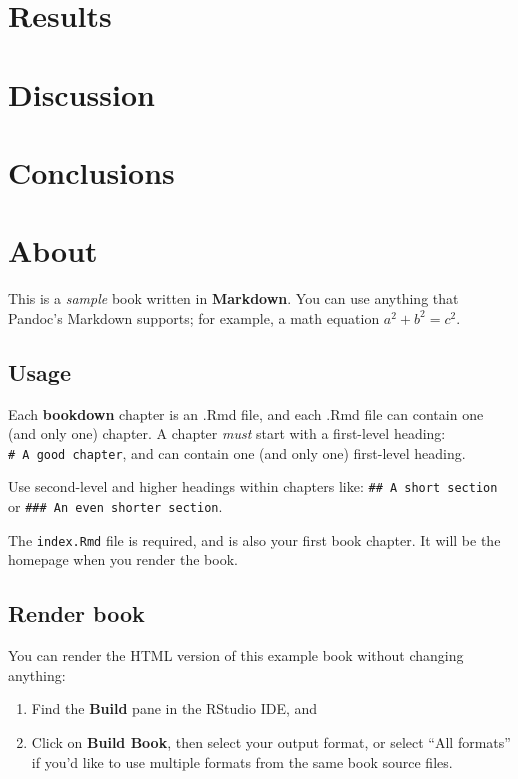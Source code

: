 \documentclass[12pt, oneside, openright]{byuthesis}
\begin{document}
\hypertarget{results}{%
\chapter{Results}\label{results}}

\hypertarget{discussion}{%
\chapter{Discussion}\label{discussion}}

\hypertarget{conclusions}{%
\chapter{Conclusions}\label{conclusions}}

\hypertarget{about}{%
\chapter{About}\label{about}}

This is a \emph{sample} book written in \textbf{Markdown}. You can use anything that Pandoc's Markdown supports; for example, a math equation \(a^2 + b^2 = c^2\).

\hypertarget{usage}{%
\section{Usage}\label{usage}}

Each \textbf{bookdown} chapter is an .Rmd file, and each .Rmd file can contain one (and only one) chapter. A chapter \emph{must} start with a first-level heading: \texttt{\#\ A\ good\ chapter}, and can contain one (and only one) first-level heading.

Use second-level and higher headings within chapters like: \texttt{\#\#\ A\ short\ section} or \texttt{\#\#\#\ An\ even\ shorter\ section}.

The \texttt{index.Rmd} file is required, and is also your first book chapter. It will be the homepage when you render the book.

\hypertarget{render-book}{%
\section{Render book}\label{render-book}}

You can render the HTML version of this example book without changing anything:

\begin{enumerate}
\def\labelenumi{\arabic{enumi}.}
\item
  Find the \textbf{Build} pane in the RStudio IDE, and
\item
  Click on \textbf{Build Book}, then select your output format, or select ``All formats'' if you'd like to use multiple formats from the same book source files.
\end{enumerate}
\end{document}
